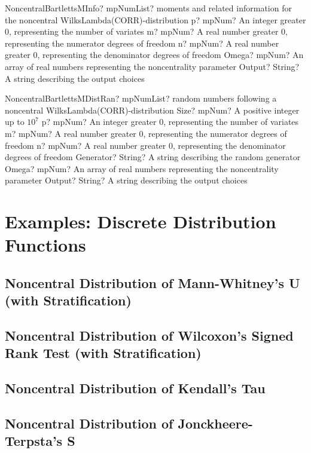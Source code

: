 \documentclass[12pt,a4paper,openany]{book}
\begin{document}
\begin{mpFunctionsExtract}
\mpFunctionFiveNotImplemented
{NoncentralBartlettsMInfo? mpNumList? moments and related information for the noncentral WilksLambda(CORR)-distribution}
{p? mpNum? An integer greater 0, representing the number of variates}
{m? mpNum? A real number greater 0, representing the numerator  degrees of freedom}
{n? mpNum? A real number greater 0, representing the denominator degrees of freedom}
{Omega? mpNum? An array of real numbers representing the noncentrality parameter}
{Output? String? A string describing the output choices}
\end{mpFunctionsExtract}

\begin{mpFunctionsExtract}
\mpFunctionSevenNotImplemented
{NoncentralBartlettsMDistRan? mpNumList? random numbers following a noncentral WilksLambda(CORR)-distribution}
{Size? mpNum? A positive integer up to $10^7$}
{p? mpNum? An integer greater 0, representing the number of variates}
{m? mpNum? A real number greater 0, representing the numerator  degrees of freedom}
{n? mpNum? A real number greater 0, representing the denominator degrees of freedom}
{Generator? String? A string describing the random generator}
{Omega? mpNum? An array of real numbers representing the noncentrality parameter}
{Output? String? A string describing the output choices}
\end{mpFunctionsExtract}

\chapter{Examples: Discrete Distribution Functions}

\section{Noncentral Distribution of Mann-Whitney's U (with Stratification)}

\section{Noncentral Distribution of Wilcoxon's Signed Rank Test (with Stratification)}

\section{Noncentral Distribution of Kendall's Tau}

\section{Noncentral Distribution of Jonckheere-Terpsta's S}
\end{document}
